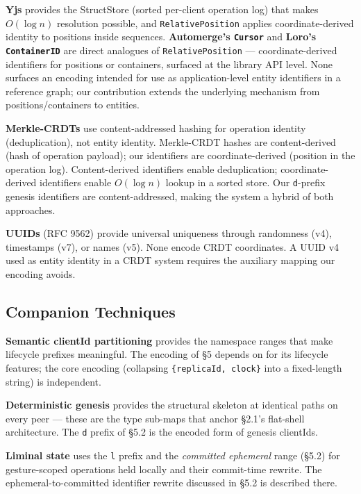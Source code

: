 \textbf{Yjs}\cite{yjs:internals} provides the StructStore (sorted per-client operation log) that makes $O(\log n)$ resolution possible, and \texttt{RelativePosition} applies coordinate-derived identity to positions inside sequences. \textbf{Automerge's \texttt{Cursor}} and \textbf{Loro's \texttt{ContainerID}} are direct analogues of \texttt{RelativePosition} --- coordinate-derived identifiers for positions or containers, surfaced at the library API level. None surfaces an encoding intended for use as application-level entity identifiers in a reference graph; our contribution extends the underlying mechanism from positions/containers to entities.

\textbf{Merkle-CRDTs}\cite{sanjuan2020merkle} use content-addressed hashing for operation identity (deduplication), not entity identity. Merkle-CRDT hashes are content-derived (hash of operation payload); our identifiers are coordinate-derived (position in the operation log). Content-derived identifiers enable deduplication; coordinate-derived identifiers enable $O(\log n)$ lookup in a sorted store. Our \texttt{d}-prefix genesis identifiers are content-addressed, making the system a hybrid of both approaches.

\textbf{UUIDs} (RFC 9562) provide universal uniqueness through randomness (v4), timestamps (v7), or names (v5). None encode CRDT coordinates. A UUID v4 used as entity identity in a CRDT system requires the auxiliary mapping our encoding avoids.

\subsection{Companion Techniques}

\textbf{Semantic clientId partitioning}\cite{plexus:partitioning} provides the namespace ranges that make lifecycle prefixes meaningful. The encoding of \S5 depends on\cite{plexus:partitioning} for its lifecycle features; the core encoding (collapsing \texttt{\{replicaId, clock\}} into a fixed-length string) is independent.

\textbf{Deterministic genesis}\cite{plexus:genesis} provides the structural skeleton at identical paths on every peer --- these are the type sub-maps that anchor \S2.1's flat-shell architecture. The \texttt{d} prefix of \S5.2 is the encoded form of genesis clientIds.

\textbf{Liminal state}\cite{plexus:liminal} uses the \texttt{l} prefix and the \emph{committed ephemeral} range (\S5.2) for gesture-scoped operations held locally and their commit-time rewrite. The ephemeral-to-committed identifier rewrite discussed in \S5.2 is described there.

